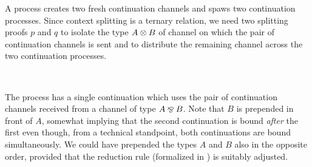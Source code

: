 \begin{AgdaAlign}
A  process creates two fresh continuation
channels and spaws two continuation processes. Since context splitting is a
ternary relation, we need two splitting proofs $p$ and $q$ to isolate the type
$A \mathbin\otimes B$ of channel on which the pair of continuation channels is sent and to
distribute the remaining channel across the two continuation processes.

\begin{code}%
%
\>[3]%
\>[13]\AgdaSymbol{:}%
\>[181I]\AgdaSpace{}%
\AgdaSpace{}%
\AgdaSpace{}%
\AgdaSymbol{\}}\AgdaSpace{}%
\AgdaSymbol{(}\AgdaSpace{}%
\AgdaSymbol{:}\AgdaSpace{}%
\AgdaSpace{}%
\AgdaSpace{}%
\AgdaSpace{}%
\AgdaSpace{}%
\AgdaSpace{}%
\AgdaOperator{\AgdaFunction{,}}\AgdaSpace{}%
\AgdaSymbol{)}\AgdaSpace{}%
\<%
\\
\>[.][@{}l@{}]\<[181I]%
\>[15]\AgdaSpace{}%
\AgdaSymbol{(}\AgdaSpace{}%
\AgdaSpace{}%
\AgdaSpace{}%
\AgdaSpace{}%
\AgdaSymbol{)}\AgdaSpace{}%
\AgdaSpace{}%
\AgdaSpace{}%
\<%
\end{code}

The  process has a single continuation which uses
the pair of continuation channels received from a channel of type $A \mathbin\bindnasrepma B$.
Note that $B$ is prepended in front of $A$, somewhat implying that the second
continuation is bound \emph{after} the first even though, from a technical
standpoint, both continuations are bound simultaneously. We could have prepended
the types $A$ and $B$ also in the opposite order, provided that the reduction
rule \RFork (formalized in ) is suitably adjusted.

\begin{code}%
%
\>[3]%
\>[13]\AgdaSymbol{:}%
\>[203I]\AgdaSpace{}%
\AgdaSpace{}%
\AgdaSymbol{\}}\AgdaSpace{}%
\AgdaSymbol{(}\AgdaSpace{}%
\AgdaSymbol{:}\AgdaSpace{}%
\AgdaSpace{}%
\AgdaSpace{}%
\AgdaSpace{}%
\AgdaSpace{}%
\AgdaOperator{\AgdaFunction{,}}\AgdaSpace{}%
\AgdaSymbol{)}\AgdaSpace{}%
\AgdaSymbol{(}\AgdaSpace{}%
\AgdaSymbol{:}\AgdaSpace{}%
\AgdaSpace{}%
\AgdaSymbol{)}\AgdaSpace{}%
\<%
\\
\>[.][@{}l@{}]\<[203I]%
\>[15]\AgdaSpace{}%
\AgdaSymbol{(}\AgdaSpace{}%
\AgdaSpace{}%
\AgdaSymbol{)}\AgdaSpace{}%
\AgdaSpace{}%
\AgdaSpace{}%
\<%
\end{code}


\end{AgdaAlign}
